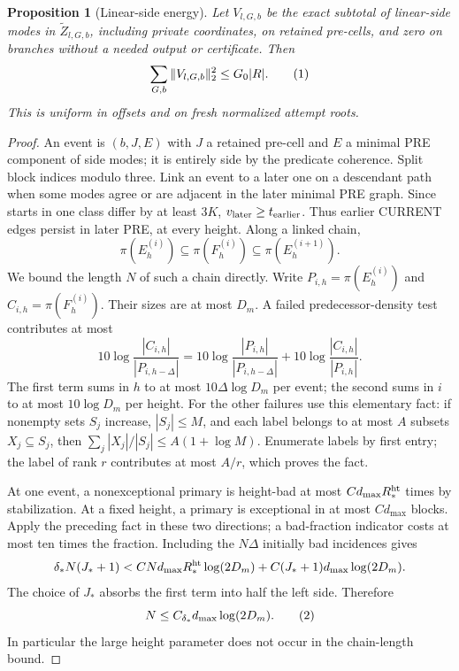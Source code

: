 \documentclass[11pt]{article}
\newtheorem{proposition}[theorem]{Proposition}
\theoremstyle{definition}
\newcommand{\eqtag}[1]{\refstepcounter{equation}\tag{\theequation}\label{#1}}
\numberwithin{equation}{section}
\begin{document}
\begin{proposition}[Linear-side energy]\label{prop:linear-side}
Let $V_{l,G,b}$ be the exact subtotal of linear-side modes in $\widetilde Z_{l,G,b}$, including private coordinates, on retained pre-cells, and zero on branches without a needed output or certificate. Then
\[
 \sum_{G,b}\|V_{l,G,b}\|_2^2\le G_0|R|.
 \eqtag{eq:linear-energy}
\]
This is uniform in offsets and on fresh normalized attempt roots.
\end{proposition}
\begin{proof}
An event is $(b,J,E)$ with $J$ a retained pre-cell and $E$ a minimal PRE component of side modes; it is entirely side by the predicate coherence. Split block indices modulo three. Link an event to a later one on a descendant path when some modes agree or are adjacent in the later minimal PRE graph. Since starts in one class differ by at least $3K$, $v_{\rm later}\ge t_{\rm earlier}$. Thus earlier CURRENT edges persist in later PRE, at every height. Along a linked chain,
\[
 \pi(E_h^{(i)})\subseteq\pi(F_h^{(i)})\subseteq\pi(E_h^{(i+1)}).
\]
We bound the length $N$ of such a chain directly. Write $P_{i,h}=\pi(E_h^{(i)})$ and $C_{i,h}=\pi(F_h^{(i)})$. Their sizes are at most $D_m$. A failed predecessor-density test contributes at most
\[
 10\log\frac{|C_{i,h}|}{|P_{i,h-\Delta}|}
 =10\log\frac{|P_{i,h}|}{|P_{i,h-\Delta}|}
  +10\log\frac{|C_{i,h}|}{|P_{i,h}|}.
\]
The first term sums in $h$ to at most $10\Delta\log D_m$ per event; the second sums in $i$ to at most $10\log D_m$ per height. For the other failures use this elementary fact: if nonempty sets $S_j$ increase, $|S_j|\le M$, and each label belongs to at most $A$ subsets $X_j\subseteq S_j$, then $\sum_j|X_j|/|S_j|\le A(1+\log M)$. Enumerate labels by first entry; the label of rank $r$ contributes at most $A/r$, which proves the fact.

At one event, a nonexceptional primary is height-bad at most $Cd_{\max}R_*^{\rm ht}$ times by stabilization. At a fixed height, a primary is exceptional in at most $Cd_{\max}$ blocks. Apply the preceding fact in these two directions; a bad-fraction indicator costs at most ten times the fraction. Including the $N\Delta$ initially bad incidences gives
\[
 \delta_*N(J_*+1)
 <C N d_{\max}R_*^{\rm ht}\log(2D_m)
  +C(J_*+1)d_{\max}\log(2D_m).
\]
The choice of $J_*$ absorbs the first term into half the left side. Therefore
\[
 N\le C_{\delta_*}d_{\max}\log(2D_m).
 \eqtag{eq:bad-density}
\]
In particular the large height parameter does not occur in the chain-length bound.


\end{proof}
\end{document}
